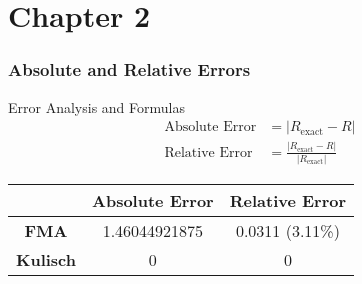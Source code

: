 \graphicspath{{../../../PhD/paper_factory/thesis_louis/Chapter2/Figs/}{../../../PhD/paper_factory/thesis_louis/Chapter3/Figs/}{../../../PhD/paper_factory/thesis_louis/Chapter4/Figs/}{../../../PhD/paper_factory/thesis_louis/Chapter5/Figs/}{../../../PhD/paper_factory/thesis_louis/Chapter6/Figs/}}

\section{Chapter 2}
\begin{frame}
    \frametitle{Absolute and Relative Errors}

        \begin{alertblock}{Error Analysis and Formulas}
            \vspace{-6mm}
            \begin{align*}
                \text{Absolute Error} &= |R_\text{exact} - R| \\
                \text{Relative Error} &= \frac{|R_\text{exact} - R|}{|R_\text{exact}|}
            \end{align*}

            \begin{table}[H]
                \centering
                \begin{tabular}{|c|c|c|}
                    \hline
                    & \textbf{Absolute Error} & \textbf{Relative Error} \\ \hline
                    \textbf{FMA} & 1.46044921875 & 0.0311 (3.11\%) \\ \hline
                    \textbf{Kulisch} & 0 & 0 \\ \hline
                \end{tabular}
            \end{table}
        \end{alertblock}
\end{frame}

